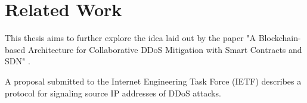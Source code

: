 \chapter{Related Work}

This thesis aims to further explore the idea laid out by the paper "A Blockchain-based Architecture for Collaborative DDoS Mitigation with Smart Contracts and SDN" \cite{ThinkingAboutSmartContractSecurity}.

A proposal submitted to the Internet Engineering Task Force (IETF) \cite{IETFDraft} describes a protocol for signaling source IP addresses of DDoS attacks. 
